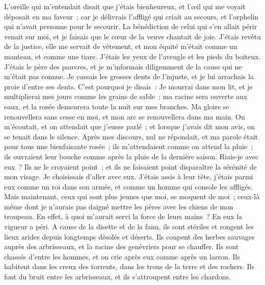 \begin{multicols}{2}
L'oreille qui m'entendait disait que j'étais bienheureux, et l'œil qui me voyait déposait en ma faveur~;
car je délivrais l'affligé qui criait au secours, et l'orphelin qui n'avait personne pour le secourir.
La bénédiction de celui qui s'en allait périr venait sur moi, et je faisais que le cœur de la veuve chantait de joie.
J'étais revêtu de la justice, elle me servait de vêtement, et mon équité m'était comme un manteau, et comme une tiare.
J'étais les yeux de l'aveugle et les pieds du boiteux.
J'étais le père des pauvres, et je m'informais diligemment de la cause qui ne m'était pas connue.
Je cassais les grosses dents de l'injuste, et je lui arrachais la proie d'entre ses dents.
C'est pourquoi je disais~: Je mourrai dans mon lit, et je multiplierai mes jours comme les grains de sable~;
ma racine sera ouverte aux eaux, et la rosée demeurera toute la nuit sur mes branches. 
Ma gloire se renouvellera sans cesse en moi, et mon arc se renouvellera dans ma main.
On m'écoutait, et on attendait que j'eusse parlé~; et lorsque j'avais dit mon avis, on se tenait dans le silence.
Après mes discours, nul ne répondait, et ma parole était pour tous une bienfaisante rosée~;
ils m'attendaient comme on attend la pluie~; ils ouvraient leur bouche comme après la pluie de la dernière saison.
Riais-je avec eux~? Ils ne le croyaient point~; et ils ne faisaient point disparaître la sérénité de mon visage.
Je choisissais d'aller avec eux. J'étais assis à leur tête, j'étais parmi eux comme un roi dans son armée, et comme un homme qui console les affligés.
\VerseOne{}Mais maintenant, ceux qui sont plus jeunes que moi, se moquent de moi~; ceux-là même dont je n'aurais pas daigné mettre les pères avec les chiens de mon troupeau.
 En effet, à quoi m'aurait servi la force de leurs mains~? En eux la vigueur a péri. 
A cause de la disette et de la faim, ils sont stériles et rongent les lieux arides depuis longtemps désolés et déserts. 
Ils coupent des herbes sauvages auprès des arbrisseaux, et la racine des genévriers pour se chauffer. 
Ils sont chassés d'entre les hommes, et on crie après eux comme après un larron. 
Ils habitent dans les creux des torrents, dans les trous de la terre et des rochers.
Ils font du bruit entre les arbrisseaux, et ils s'attroupent entre les chardons. 

\end{multicols}
